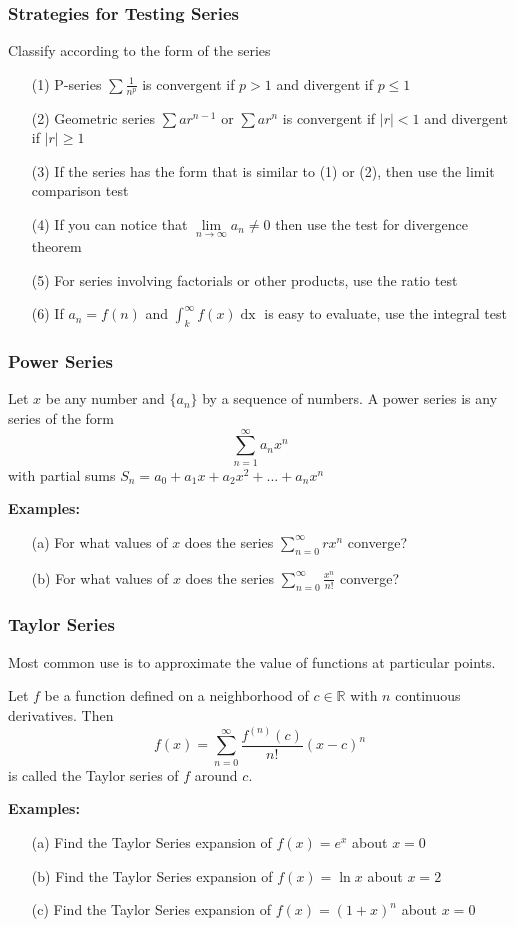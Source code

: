 \documentclass{beamer}
\begin{document}
\begin{frame}
\frametitle{Strategies for Testing Series}
Classify according to the form of the series
\begin{itemize}
	\item[(1)] P-series $\sum \frac{1}{n^p}$ is convergent if $p>1$ and divergent if $p \leq 1$
	\item[(2)] Geometric series $\sum ar^{n-1}$ or $\sum ar^n$ is convergent if $|r| < 1$ and divergent if $|r| \geq 1$
	\item[(3)] If the series has the form that is similar to (1) or (2), then use the limit comparison test
	\item[(4)] If you can notice that $\lim\limits_{n \to \infty} a_n \neq 0$ then use the test for divergence theorem
	\item[(5)] For series involving factorials or other products, use the ratio test
	\item[(6)] If $a_n = f(n)$ and $\int_k^\infty f(x) \mathop{dx}$ is easy to evaluate, use the integral test
\end{itemize}
\end{frame}

\begin{frame}
\frametitle{Power Series}
Let $x$ be any number and $\{a_n\}$ by a sequence of numbers. A power series is any series of the form 
$$\sum_{n=1}^\infty a_n x^n$$
with partial sums $S_n = a_0 + a_1x + a_2x^2 + ... + a_nx^n$

\vspace{12pt}
\textbf{Examples:}
\begin{itemize}
	\item[(a)] For what values of $x$ does the series $\sum_{n=0}^\infty rx^n$ converge?
	\item[(b)] For what values of $x$ does the series $\sum_{n=0}^\infty \frac{x^n}{n!}$ converge?
\end{itemize}
\end{frame}

\begin{frame}
\frametitle{Taylor Series}
Most common use is to approximate the value of functions at particular points.
\begin{theorem}
	Let $f$ be a function defined on a neighborhood of $c \in \mathbb{R}$ with $n$ continuous derivatives. Then
	$$f(x) = \sum_{n=0}^{\infty} \frac{f^{(n)}(c)}{n!} (x-c)^n$$
	is called the Taylor series of $f$ around $c$.
\end{theorem}

\vspace{6pt}
\textbf{Examples:}
\begin{itemize}
	\item[(a)] Find the Taylor Series expansion of $f(x) = e^{x}$ about $x=0$
	\item[(b)] Find the Taylor Series expansion of $f(x) = \ln x$ about $x=2$
	\item[(c)] Find the Taylor Series expansion of $f(x) = (1+x)^n$ about $x=0$
\end{itemize}
\end{frame}
\end{document}
